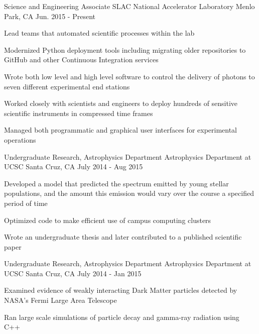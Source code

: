 \begin{cventries}
  \cventry
    {Science and Engineering Associate}
    {SLAC National Accelerator Laboratory}
    {Menlo Park, CA}
    {Jun. 2015 - Present}
    {
      \begin{cvitems}
        \item {Lead teams that automated scientific processes within the lab}
        \item {Modernized Python deployment tools including migrating older
               repositories to GitHub and other Continuous Integration
               services}
        \item {Wrote both low level and high level software to control the
               delivery of photons to seven different experimental end stations}
        \item {Worked closely with scientists and engineers to deploy hundreds
               of sensitive scientific instruments in compressed time frames}
        \item {Managed both programmatic and graphical user interfaces for
               experimental operations} 
    \end{cvitems}
    }
  \cventry
    {Undergraduate Research, Astrophysics Department}
    {Astrophysics Department at UCSC}
    {Santa Cruz, CA}
    {July 2014 - Aug 2015}
    {
      \begin{cvitems}
        \item {Developed a model that predicted the spectrum emitted by young
               stellar populations, and the amount this emission would vary
               over the course a specified period of time}
        \item {Optimized code to make efficient use of campus computing
               clusters}
        \item {Wrote an undergraduate thesis and later contributed to a
               published scientific paper}
      \end{cvitems}
      }
  \cventry
    {Undergraduate Research, Astrophysics Department}
    {Astrophysics Department at UCSC}
    {Santa Cruz, CA}
    {July 2014 - Jan 2015}
    {
      \begin{cvitems}
        \item {Examined evidence of weakly interacting Dark Matter particles
               detected by NASA's Fermi Large Area Telescope}
        \item {Ran large scale simulations of particle decay and gamma-ray
               radiation using C++}
      \end{cvitems}
      }
\end{cventries}
